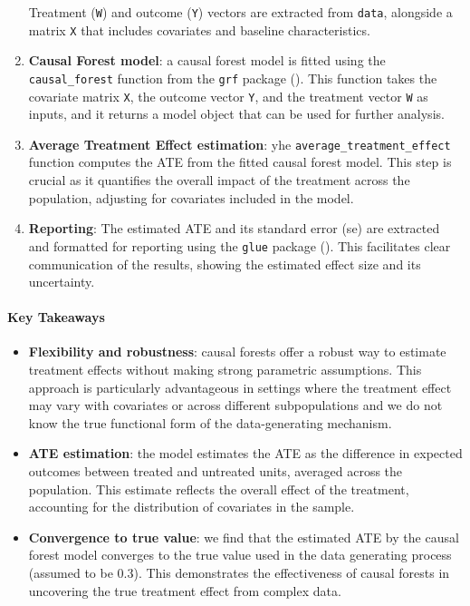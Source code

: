 \documentclass[
  singlecolumn]{article}
\let\oldparagraph\paragraph
\renewcommand{\paragraph}[1]{\oldparagraph{#1}\mbox{}}
\begin{document}
\begin{enumerate}
  Treatment (\texttt{W}) and outcome (\texttt{Y}) vectors are extracted
  from \texttt{data}, alongside a matrix \texttt{X} that includes
  covariates and baseline characteristics.
\item
  \textbf{Causal Forest model}: a causal forest model is fitted using
  the \texttt{causal\_forest} function from the \texttt{grf} package
  (). This function
  takes the covariate matrix \texttt{X}, the outcome vector \texttt{Y},
  and the treatment vector \texttt{W} as inputs, and it returns a model
  object that can be used for further analysis.
\item
  \textbf{Average Treatment Effect estimation}: yhe
  \texttt{average\_treatment\_effect} function computes the ATE from the
  fitted causal forest model. This step is crucial as it quantifies the
  overall impact of the treatment across the population, adjusting for
  covariates included in the model.
\item
  \textbf{Reporting}: The estimated ATE and its standard error (se) are
  extracted and formatted for reporting using the \texttt{glue} package
  (). This
  facilitates clear communication of the results, showing the estimated
  effect size and its uncertainty.
\end{enumerate}

\paragraph{Key Takeaways}\label{key-takeaways}

\begin{itemize}
\item
  \textbf{Flexibility and robustness}: causal forests offer a robust way
  to estimate treatment effects without making strong parametric
  assumptions. This approach is particularly advantageous in settings
  where the treatment effect may vary with covariates or across
  different subpopulations and we do not know the true functional form
  of the data-generating mechanism.
\item
  \textbf{ATE estimation}: the model estimates the ATE as the difference
  in expected outcomes between treated and untreated units, averaged
  across the population. This estimate reflects the overall effect of
  the treatment, accounting for the distribution of covariates in the
  sample.
\item
  \textbf{Convergence to true value}: we find that the estimated ATE by
  the causal forest model converges to the true value used in the data
  generating process (assumed to be 0.3). This demonstrates the
  effectiveness of causal forests in uncovering the true treatment
  effect from complex data.
\end{itemize}
\end{document}

